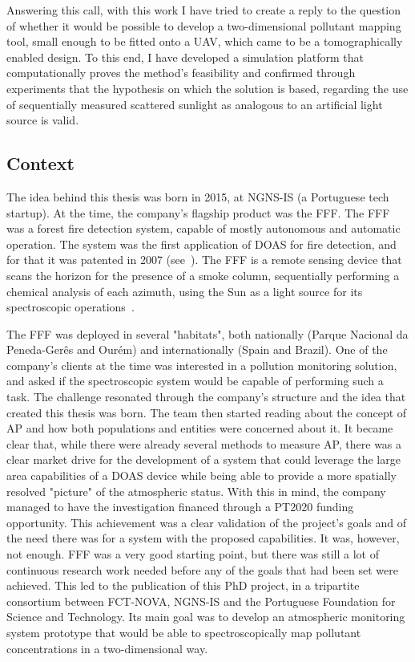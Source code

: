 Answering this call, with this work I have tried to create a reply to
the question of whether it would be possible to develop a
two-dimensional pollutant mapping tool, small enough to be fitted onto a
\gls{UAV}, which came to be a tomographically enabled design. To this
end, I have developed a simulation platform that computationally proves
the method's feasibility and confirmed through experiments that the
hypothesis on which the solution is based, regarding the use of
sequentially measured scattered sunlight as analogous to an artificial
light source is valid.

\subsection{Context}%
\label{sub:context}

The idea behind this thesis was born in 2015, at NGNS-IS (a Portuguese
tech startup). At the time, the company's flagship product was the
\gls{FFF}. The \gls{FFF} was a forest fire detection system, capable of
mostly autonomous and automatic operation.  The system was the first
application of \gls{DOAS} for fire detection, and for that it was
patented in 2007 (see~\cite{Vieira2007, Application2008}). The \gls{FFF}
is a remote sensing device that scans the horizon for the presence of a
smoke column, sequentially performing a chemical analysis of each
azimuth, using the Sun as a light source for its spectroscopic
operations~\cite{ValentedeAlmeida2017}.

The \gls{FFF} was deployed in several "habitats", both nationally
(Parque Nacional da Peneda-Gerês and Ourém) and internationally (Spain
and Brazil). One of the company's clients at the time was interested in
a pollution monitoring solution, and asked if the spectroscopic system
would be capable of performing such a task. The challenge resonated
through the company's structure and the idea that created this thesis
was born. The team then started reading about the concept of \gls{AP}
and how both populations and entities were concerned about it. It became
clear that, while there were already several methods to measure
\gls{AP}, there was a clear market drive for the development of a system
that could leverage the large area capabilities of a \gls{DOAS} device
while being able to provide a more spatially resolved "picture" of the
atmospheric status. With this in mind, the company managed to have the
investigation financed through a \gls{PT2020} funding opportunity. This
achievement was a clear validation of the project's goals and of the
need there was for a system with the proposed capabilities. It was,
however, not enough. \gls{FFF} was a very good starting point, but there
was still a lot of continuous research work needed before any of the
goals that had been set were achieved. This led to the publication of
this PhD project, in a tripartite consortium between FCT-NOVA, NGNS-IS
and the Portuguese Foundation for Science and Technology. Its main goal
was to develop an atmospheric monitoring system prototype that would be
able to spectroscopically map pollutant concentrations in a
two-dimensional way.

